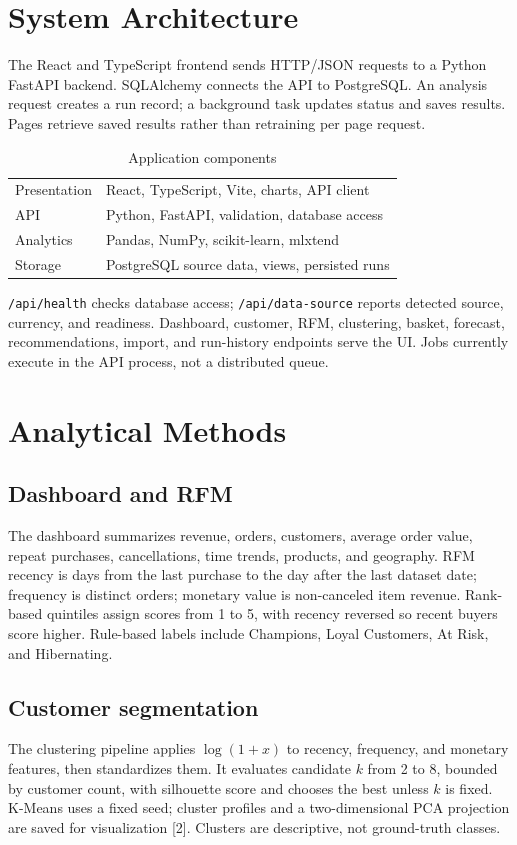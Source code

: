 \documentclass[conference]{IEEEtran}
\begin{document}
\section{System Architecture}
The React and TypeScript frontend sends HTTP/JSON requests to a Python FastAPI backend. SQLAlchemy connects the API to PostgreSQL. An analysis request creates a run record; a background task updates status and saves results. Pages retrieve saved results rather than retraining per page request.
\begin{table}[t]
\caption{Application components}
\centering\footnotesize
\begin{tabular}{p{} p{}}
\toprule
Presentation & React, TypeScript, Vite, charts, API client\\
API & Python, FastAPI, validation, database access\\
Analytics & Pandas, NumPy, scikit-learn, mlxtend\\
Storage & PostgreSQL source data, views, persisted runs\\
\bottomrule
\end{tabular}
\end{table}
\texttt{/api/health} checks database access; \texttt{/api/data-source} reports detected source, currency, and readiness. Dashboard, customer, RFM, clustering, basket, forecast, recommendations, import, and run-history endpoints serve the UI. Jobs currently execute in the API process, not a distributed queue.
\section{Analytical Methods}
\subsection{Dashboard and RFM}
The dashboard summarizes revenue, orders, customers, average order value, repeat purchases, cancellations, time trends, products, and geography. RFM recency is days from the last purchase to the day after the last dataset date; frequency is distinct orders; monetary value is non-canceled item revenue. Rank-based quintiles assign scores from 1 to 5, with recency reversed so recent buyers score higher. Rule-based labels include Champions, Loyal Customers, At Risk, and Hibernating.
\subsection{Customer segmentation}
The clustering pipeline applies $\log(1+x)$ to recency, frequency, and monetary features, then standardizes them. It evaluates candidate $k$ from 2 to 8, bounded by customer count, with silhouette score and chooses the best unless $k$ is fixed. K-Means uses a fixed seed; cluster profiles and a two-dimensional PCA projection are saved for visualization [2]. Clusters are descriptive, not ground-truth classes.
\end{document}
